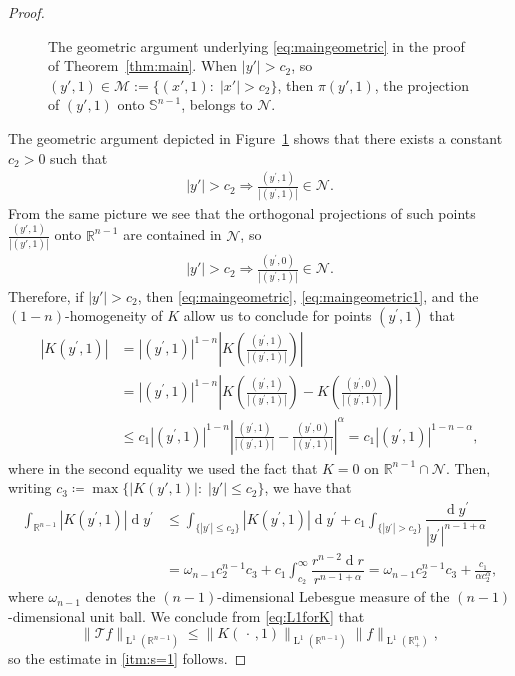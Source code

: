 \documentclass[a4paper,10pt]{amsart}
\newcommand{\R}{\mathbb R}
\renewcommand{\leq}{\leqslant}
\newcommand{\dif}{\mathrm{d}}
\renewcommand{\dif}{\operatorname{d}\!}
\newcommand{\lebe}{\operatorname{L}}
\numberwithin{equation}{section}
\theoremstyle{remark}
\numberwithin{equation}{section}
\begin{document}
\begin{proof}
\begin{figure}
			\caption{The geometric argument underlying \eqref{eq:maingeometric} in the proof of Theorem~\ref{thm:main}. When $|y'|>c_{2}$, so $(y',1)\in\mathcal{M}:=\{(x',1)\colon\;|x'|>c_{2}\}$,  then $\pi(y',1)$, the projection of $(y',1)$ onto $\mathbb{S}^{n-1}$, belongs to $\mathcal{N}$. }
			\label{fig:geometric}
		\end{figure}
		The geometric argument depicted in Figure~\ref{fig:geometric} shows that there exists a constant $c_{2}>0$ such that 
		\begin{align}\label{eq:maingeometric}
			|y'|>c_{2}\Rightarrow\frac{(y^\prime,1)}{|(y^\prime,1)|}\in\mathcal{N}.
		\end{align}
		From the same picture we see that the orthogonal projections of such points $\tfrac{(y',1)}{|(y',1)|}$ onto $\R^{n-1}$  are contained in $\mathcal{N}$, so
		\begin{align}\label{eq:maingeometric1}
			|y'|>c_{2}\Rightarrow\frac{(y^\prime,0)}{|(y^\prime,1)|}\in\mathcal{N}.
		\end{align}
		Therefore, if $|y'|>c_{2}$, then \eqref{eq:maingeometric},  \eqref{eq:maingeometric1}, and the $(1-n)$-homogeneity of $K$ allow us to conclude for points $(y^\prime,1)$ that
		\begin{align*}
			|K(y^\prime,1)|&=|(y^\prime,1)|^{1-n}\left|K\left(\frac{(y^\prime,1)}{|(y^\prime,1)|}\right)\right|\\
			&=|(y^\prime,1)|^{1-n}\left|K\left(\frac{(y^\prime,1)}{|(y^\prime,1)|}\right)-K\left(\frac{(y^\prime,0)}{|(y^\prime,1)|}\right)\right|\\
			&\leq c_1|(y^\prime,1)|^{1-n}\left|\frac{(y^\prime,1)}{|(y^\prime,1)|}-\frac{(y^\prime,0)}{|(y^\prime,1)|}\right|^\alpha=c_1|(y^\prime,1)|^{1-n-\alpha},
		\end{align*}
		where in the second equality we used the fact that $K=0$ on $\R^{n-1}\cap\mathcal{N}$. Then, writing $c_3\coloneqq\max\{|K(y',1)|\colon\;|y'|\leq c_{2}\}$, we have that
		\begin{align*}
			\int_{\R^{n-1}}|K(y^\prime,1)|\dif y^\prime	&	\leq \int_{\{|y^\prime|\leq c_2\}} |K(y^\prime,1)|\dif y^\prime +c_1\int_{\{|y^\prime|> c_2\}}\dfrac{\dif y^\prime}{|y^\prime|^{n-1+\alpha}}\\
			&= \omega_{n-1}c_{2}^{n-1}c_{3} + c_1\int_{c_2}^\infty\dfrac{r^{n-2}\dif r}{r^{n-1+\alpha}}=\omega_{n-1}c_{2}^{n-1}c_{3}+\frac{c_1}{\alpha c_2^\alpha},
		\end{align*}
		where $\omega_{n-1}$ denotes the $(n-1)$-dimensional Lebesgue  measure of the $(n-1)$-dimensional unit ball. We conclude from \eqref{eq:L1forK} that 
		$$
		\|\mathcal T f\|_{\lebe^1(\R^{n-1})}\leq \|K(\,\cdot\,,1)\|_{\lebe^1(\R^{n-1})}\|f\|_{\lebe^1(\R^n_+)},
		$$
		so the estimate in \ref{itm:s=1} follows.
		

\end{proof}
\end{document}
